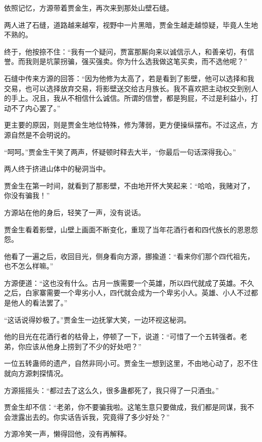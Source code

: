 
\begin{this_body}



依照记忆，方源带着贾金生，再次来到那处山壁石缝。

两人进了石缝，道路越来越窄，视野中一片黑暗，贾金生越走越惊疑，毕竟人生地不熟的。

终于，他按捺不住：“我有一个疑问，贾富那厮向来以诚信示人，和善亲切，有信誉。而我则是坑蒙拐骗，强买强卖。你为什么选我做这笔买卖，而不选他呢？”

石缝中传来方源的回答：“因为他修为太高了，若是看到了影壁，他可以选择和我交易，也可以选择放弃交易，将影壁送交给古月族长。我不喜欢把主动权交到别人的手上。况且，我从不相信什么诚信。所谓的信誉，都是狗屁，不过是利益小，打动不了内心罢了。”

更主要的原因，则是贾金生地位特殊，修为薄弱，更方便操纵摆布。不过这点，方源自然是不会明说的。

“呵呵。”贾金生干笑了两声，怀疑顿时释去大半，“你最后一句话深得我心。”

两人终于挤进山体中的秘洞当中。

贾金生在第一时间，就看到了那影壁，不由地开怀大笑起来：“哈哈，我赌对了，你没有骗我！”

方源站在他的身后，轻笑了一声，没有说话。

贾金生看着影壁，山壁上画面不断变化，重现了当年花酒行者和四代族长的恩恩怨怨。

他看了一遍之后，收回目光，侧身看向方源，挪揄道：“看来你们那个四代祖先，也不怎么样嘛。”

方源便道：“这也没有什么。古月一族需要一个英雄，所以四代就成了英雄。不久之后，白家寨需要一个卑劣小人，四代就会成为一个卑劣小人。英雄、小人不过都是他人的看法罢了。”

“这话说得妙极了。”贾金生一边抚掌大笑，一边环视这秘洞。

他的目光在花酒行者的枯骨上，停顿了一下，说道：“可惜了一个五转强者。老弟，你应该从他身上捞到了不少的好处吧？”

一位五转蛊师的遗产，自然非同小可。贾金生一想到这里，不由地心动了，忍不住就向方源刺探情况。

方源摇摇头：“都过去了这么久，很多蛊都死了，我只得了一只酒虫。”

贾金生却不信：“老弟，你不要骗我啦。这笔生意只要做成，我们都是同谋，我不会泄露出去的。你实话告诉我，究竟得了多少好处？”

方源冷笑一声，懒得回他，没有再解释。


\end{this_body}
